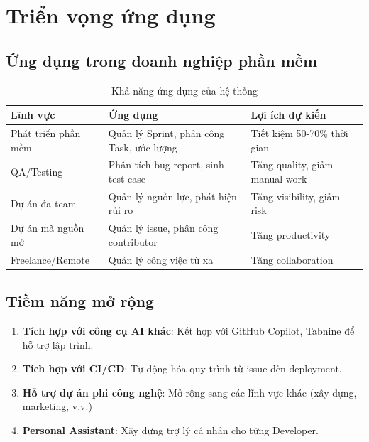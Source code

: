 \documentclass[12pt,a4paper]{report}
\begin{document}
\section{Triển vọng ứng dụng}

\subsection{Ứng dụng trong doanh nghiệp phần mềm}

\begin{table}[H]
\centering
\caption{Khả năng ứng dụng của hệ thống}
\begin{tabular}{|p{4.5cm}|p{5cm}|p{5cm}|}
\hline
\textbf{Lĩnh vực} & \textbf{Ứng dụng} & \textbf{Lợi ích dự kiến} \\
\hline
Phát triển phần mềm & Quản lý Sprint, phân công Task, ước lượng & Tiết kiệm 50-70\% thời gian \\
\hline
QA/Testing & Phân tích bug report, sinh test case & Tăng quality, giảm manual work \\
\hline
Dự án đa team & Quản lý nguồn lực, phát hiện rủi ro & Tăng visibility, giảm risk \\
\hline
Dự án mã nguồn mở & Quản lý issue, phân công contributor & Tăng productivity \\
\hline
Freelance/Remote & Quản lý công việc từ xa & Tăng collaboration \\
\hline
\end{tabular}
\label{tab:application_areas}
\end{table}

\subsection{Tiềm năng mở rộng}

\begin{enumerate}
\item \textbf{Tích hợp với công cụ AI khác}: Kết hợp với GitHub Copilot, Tabnine để hỗ trợ lập trình.
\item \textbf{Tích hợp với CI/CD}: Tự động hóa quy trình từ issue đến deployment.
\item \textbf{Hỗ trợ dự án phi công nghệ}: Mở rộng sang các lĩnh vực khác (xây dựng, marketing, v.v.)
\item \textbf{Personal Assistant}: Xây dựng trợ lý cá nhân cho từng Developer.
\end{enumerate}
\end{document}
